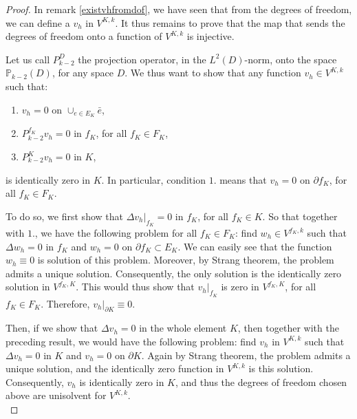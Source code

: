 \begin{proof}
In remark \ref{existvhfromdof}, we have seen that from the degrees of freedom, we can define a $v_h$ in $V^{K,k}$. It thus remains to prove that the map that sends the degrees of freedom onto a function of $V^{K,k}$ is injective. 

Let us call $P_{k-2}^D$ the projection operator, in the $L^2(D)$-norm, onto the space $\mathbb{P}_{k-2}(D)$, for any space $D$. We thus want to show that any function $v_h\in V^{K,k}$ such that:
\begin{enumerate}
\item $v_h=0$ on $\cup_{e\in E_K} \bar{e}$, 
\item $P_{k-2}^{f_K}v_h = 0$ in $f_K$, for all $f_K\in F_K$,
\item $P_{k-2}^Kv_h = 0$ in $K$,
\end{enumerate}
is identically zero in $K$. In particular, condition $1.$ means that $v_h = 0$ on $\partial f_K$, for all $f_K\in F_K$.

To do so, we first show that $\Delta v_h|_{f_K}=0$ in $f_K$, for all $f_K\in K$. So that together with $1.$, we have the following problem for all $f_K\in F_K$: find $w_h\in V^{f_K,k}$ such that $\Delta w_h = 0$ in $f_K$ and $w_h = 0$ on $\partial f_K\subset E_K$. We can easily see that the function $w_h\equiv 0$ is solution of this problem. Moreover, by Strang theorem, the problem admits a unique solution. Consequently, the only solution is the identically zero solution in $V^{f_K,K}$. This would thus show that $v_h|_{f_K}$ is zero in $V^{f_K,K}$, for all $f_K\in F_K$. Therefore, $v_h|_{\partial K} \equiv 0$. 

Then, if we show that $\Delta v_h = 0$ in the whole element $K$, then together with the preceding result, we would have the following problem: find $v_h$ in $V^{K,k}$ such that $\Delta v_h = 0$ in $K$ and $v_h=0$ on $\partial K$. Again by Strang theorem, the problem admits a unique solution, and the identically zero function in $V^{K,k}$ is this solution. Consequently, $v_h$ is identically zero in $K$, and thus the degrees of freedom chosen above are unisolvent for $V^{K,k}$. \\


\end{proof}
